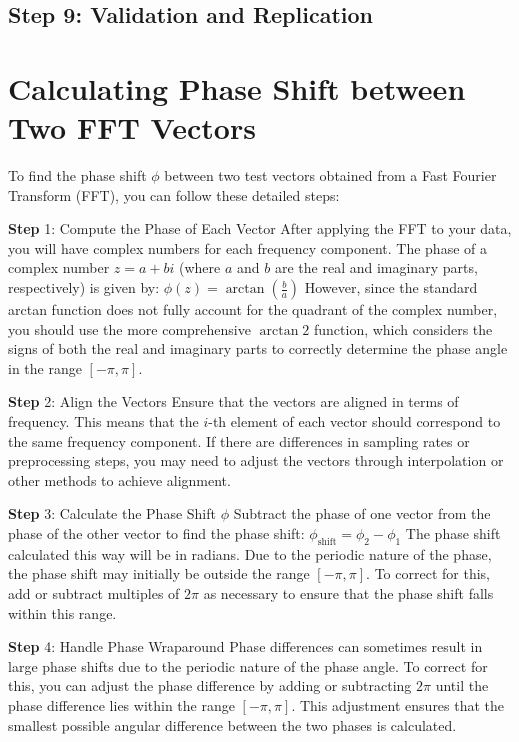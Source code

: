 \documentclass[twocolumn]{article}
\begin{document}
\subsection{ Step 9: Validation and Replication}


\section{Calculating Phase Shift between Two FFT Vectors}
To find the phase shift $\phi$ between two test vectors obtained from a Fast Fourier Transform (FFT), you can follow these detailed steps:

\noindent \textbf{Step } 1: Compute the Phase of Each Vector
After applying the FFT to your data, you will have complex numbers for each frequency component. The phase of a complex number $z = a + bi$ (where $a$
and $b$ are the real and imaginary parts, respectively) is given by:
$\phi(z) = \arctan\left(\frac{b}{a}\right)$
However, since the standard arctan function does not fully account for the quadrant of the complex number, you should use the more comprehensive
$\arctan2$ function, which considers the signs of both the real and imaginary parts to correctly determine the phase angle in the range $[-\pi, \pi]$.

\noindent \textbf{Step } 2: Align the Vectors
Ensure that the vectors are aligned in terms of frequency. This means that the $i$-th element of each vector should correspond to the same frequency
component. If there are differences in sampling rates or preprocessing steps, you may need to adjust the vectors through interpolation or other methods
to achieve alignment.

\noindent \textbf{Step } 3: Calculate the Phase Shift $\phi$
Subtract the phase of one vector from the phase of the other vector to find the phase shift:
$\phi_{\text{shift}} = \phi_2 - \phi_1$
The phase shift calculated this way will be in radians. Due to the periodic nature of the phase, the phase shift may initially be outside the range $[-\pi,\pi]$. To correct for this, add or subtract multiples of $2\pi $ as necessary to ensure that the phase shift falls within this range.

\noindent \textbf{Step } 4: Handle Phase Wraparound
Phase differences can sometimes result in large phase shifts due to the periodic nature of the phase angle. To correct for this, you can adjust the phase
difference by adding or subtracting $2\pi $ until the phase difference lies within the range $[-\pi,\pi]$. This adjustment ensures that the smallest possible
angular difference between the two phases is calculated.
\end{document}
